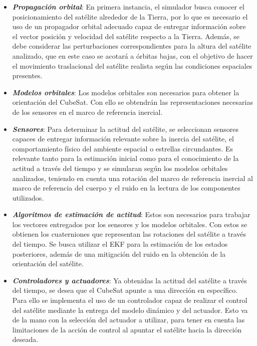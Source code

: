 \begin{itemize}
	\item \textbf{\textit{Propagación orbital}}: En primera instancia, el simulador busca conocer el posicionamiento del satélite alrededor de la Tierra, por lo que es necesario el uso de un propagador orbital adecuado capaz de entregar información sobre el vector posición y velocidad del satélite respecto a la Tierra. Además, se debe considerar las perturbaciones correspondientes para la altura del satélite analizado, que en este caso se acotará a órbitas bajas, con el objetivo de hacer el movimiento traslacional del satélite realista según las condiciones espaciales presentes.
	
	\item \textbf{\textit{Modelos orbitales}}: Los modelos orbitales son necesarios para obtener la orientación del CubeSat. Con ello se obtendrán las representaciones necesarias de los sensores en el marco de referencia inercial.
	
	\item \textbf{\textit{Sensores}}: Para determinar la actitud del satélite, se seleccionan sensores capaces de entregar información relevante sobre la inercia del satélite, el comportamiento físico del ambiente espacial o estrellas circundantes. Es relevante tanto para la estimación inicial como para el conocimiento de la actitud a través del tiempo y se simularan según los modelos orbitales analizados, teniendo en cuenta una rotación del marco de referencia inercial al marco de referencia del cuerpo y el ruido en la lectura de los componentes utilizados.
	
	\item \textbf{\textit{Algoritmos de estimación de actitud}}: Estos son necesarios para trabajar los vectores entregados por los sensores y los modelos orbitales. Con estos se obtienen los cuaterniones que representan las rotaciones del satélite a través del tiempo. Se busca utilizar el EKF para la estimación de los estados posteriores, además de una mitigación del ruido en la obtención de la orientación del satélite.
	
	\item \textbf{\textit{ Controladores y actuadores}}: Ya obtenidas la actitud del satélite a través del tiempo, se desea que el CubeSat apunte a una dirección en específico. Para ello se implementa el uso de un controlador capaz de realizar el control del satélite mediante la entrega del modelo dinámico y del actuador. Esto va de la mano con la selección del actuador a utilizar, para tener en cuenta las limitaciones de la acción de control al apuntar el satélite hacia la dirección deseada.
	
\end{itemize}

